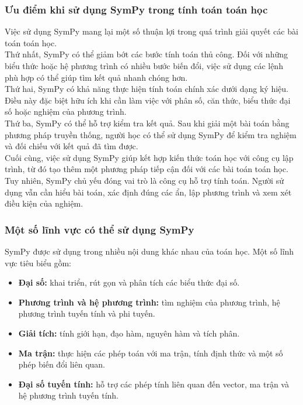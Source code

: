 \documentclass[13pt,a4paper]{article}
\begin{document}
\subsubsection{Ưu điểm khi sử dụng SymPy trong tính toán toán học}
Việc sử dụng SymPy mang lại một số thuận lợi trong quá trình giải quyết các bài toán toán học.\\

\noindent Thứ nhất, SymPy có thể giảm bớt các bước tính toán thủ công. Đối với những biểu thức hoặc hệ phương trình có nhiều bước biến đổi, việc sử dụng các lệnh phù hợp có thể giúp tìm kết quả nhanh chóng hơn.\\
\noindent Thứ hai, SymPy có khả năng thực hiện tính toán chính xác dưới dạng ký hiệu. Điều này đặc biệt hữu ích khi cần làm việc với phân số, căn thức, biểu thức đại số hoặc nghiệm của phương trình.\\
\noindent Thứ ba, SymPy có thể hỗ trợ kiểm tra kết quả. Sau khi giải một bài toán bằng phương pháp truyền thống, người học có thể sử dụng SymPy để kiểm tra nghiệm và đối chiếu với kết quả đã tìm được.\\
\noindent Cuối cùng, việc sử dụng SymPy giúp kết hợp kiến thức toán học với công cụ lập trình, từ đó tạo thêm một phương pháp tiếp cận đối với các bài toán toán học.\\
\noindent Tuy nhiên, SymPy chủ yếu đóng vai trò là công cụ hỗ trợ tính toán. Người sử dụng vẫn cần hiểu bài toán, xác định đúng các ẩn, lập phương trình và xem xét điều kiện của nghiệm.
\subsubsection{Một số lĩnh vực có thể sử dụng SymPy}
SymPy được sử dụng trong nhiều nội dung khác nhau của toán học. Một số lĩnh vực tiêu biểu gồm:
\begin{itemize}[itemsep=4pt, parsep=2pt]
    \item \textbf{Đại số:} khai triển, rút gọn và phân tích các biểu thức đại số.
    \item \textbf{Phương trình và hệ phương trình:} tìm nghiệm của phương trình, hệ phương trình tuyến tính và phi tuyến.
    \item \textbf{Giải tích:} tính giới hạn, đạo hàm, nguyên hàm và tích phân.
    \item \textbf{Ma trận:} thực hiện các phép toán với ma trận, tính định thức và một số phép biến đổi liên quan.
    \item \textbf{Đại số tuyến tính:} hỗ trợ các phép tính liên quan đến vector, ma trận và hệ phương trình tuyến tính.
\end{itemize}
\end{document}
